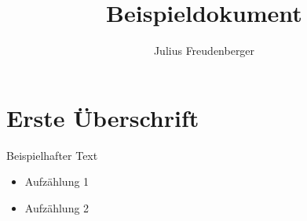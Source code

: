 \documentclass[a4paper]{book}
\title{Beispieldokument}
\author{Julius Freudenberger}
\begin{document}
\maketitle
\tableofcontents
\section{Erste Überschrift}
Beispielhafter Text
\begin{itemize}
  \item Aufzählung 1
  \item Aufzählung 2
\end{itemize}
\end{document}
